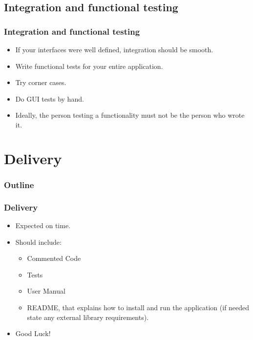 \documentclass[10pt]{beamer}
\begin{document}
\subsection{Integration and functional testing}
\begin{frame}
  \frametitle{Integration and functional testing}
  \begin{itemize}
  \item If your interfaces were well defined, integration should be smooth.
  \item Write functional tests for your entire application.
  \item Try corner cases.
  \item Do GUI tests by hand.
  \item Ideally, the person testing a functionality must not be the person who
    wrote it.
  \end{itemize}
\end{frame}

\section{Delivery}
\begin{frame}
  \frametitle{Outline}
  \tableofcontents[currentsection]
\end{frame}

\begin{frame}
\frametitle{Delivery}
\begin{itemize}
\item Expected on time.
\item Should include:
\begin{itemize}
  \item Commented Code
  \item Tests
  \item User Manual
  \item README, that explains how to install and run the application (if needed
    state any external library requirements).
\end{itemize}
\item Good Luck!
\end{itemize}
\end{frame}
\end{document}
